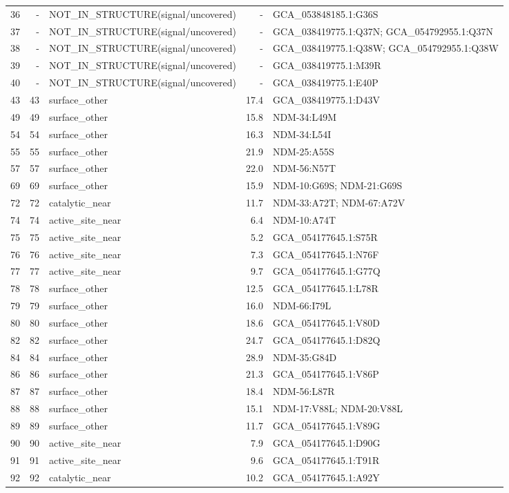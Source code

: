 \begin{longtable}{rrlrl}
36&-&NOT\_IN\_STRUCTURE(signal/uncovered)&-&GCA\_053848185.1:G36S\\
37&-&NOT\_IN\_STRUCTURE(signal/uncovered)&-&GCA\_038419775.1:Q37N; GCA\_054792955.1:Q37N\\
38&-&NOT\_IN\_STRUCTURE(signal/uncovered)&-&GCA\_038419775.1:Q38W; GCA\_054792955.1:Q38W\\
39&-&NOT\_IN\_STRUCTURE(signal/uncovered)&-&GCA\_038419775.1:M39R\\
40&-&NOT\_IN\_STRUCTURE(signal/uncovered)&-&GCA\_038419775.1:E40P\\
43&43&surface\_other&17.4&GCA\_038419775.1:D43V\\
49&49&surface\_other&15.8&NDM-34:L49M\\
54&54&surface\_other&16.3&NDM-34:L54I\\
55&55&surface\_other&21.9&NDM-25:A55S\\
57&57&surface\_other&22.0&NDM-56:N57T\\
69&69&surface\_other&15.9&NDM-10:G69S; NDM-21:G69S\\
72&72&catalytic\_near&11.7&NDM-33:A72T; NDM-67:A72V\\
74&74&active\_site\_near&6.4&NDM-10:A74T\\
75&75&active\_site\_near&5.2&GCA\_054177645.1:S75R\\
76&76&active\_site\_near&7.3&GCA\_054177645.1:N76F\\
77&77&active\_site\_near&9.7&GCA\_054177645.1:G77Q\\
78&78&surface\_other&12.5&GCA\_054177645.1:L78R\\
79&79&surface\_other&16.0&NDM-66:I79L\\
80&80&surface\_other&18.6&GCA\_054177645.1:V80D\\
82&82&surface\_other&24.7&GCA\_054177645.1:D82Q\\
84&84&surface\_other&28.9&NDM-35:G84D\\
86&86&surface\_other&21.3&GCA\_054177645.1:V86P\\
87&87&surface\_other&18.4&NDM-56:L87R\\
88&88&surface\_other&15.1&NDM-17:V88L; NDM-20:V88L\\
89&89&surface\_other&11.7&GCA\_054177645.1:V89G\\
90&90&active\_site\_near&7.9&GCA\_054177645.1:D90G\\
91&91&active\_site\_near&9.6&GCA\_054177645.1:T91R\\
92&92&catalytic\_near&10.2&GCA\_054177645.1:A92Y\\

\end{longtable}
